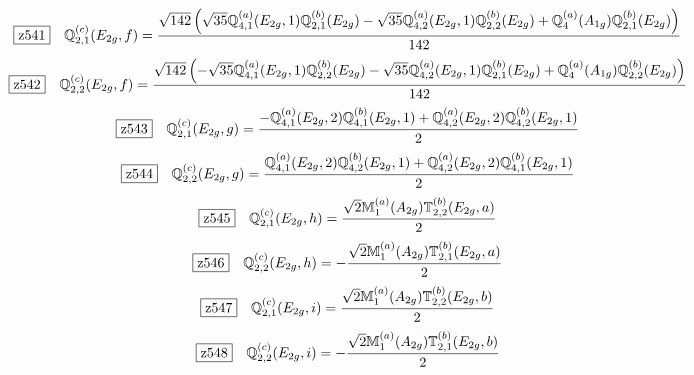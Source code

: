 \documentclass[fleqn,10pt,landscape]{jsarticle}
\begin{document}
\begin{dmath*}
\hspace*{3mm}\fbox{z541}\quad \mathbb{Q}_{2,1}^{(c)}(E_{2g},f)=\frac{\sqrt{142} \left(\sqrt{35} \mathbb{Q}_{4,1}^{(a)}(E_{2g},1) \mathbb{Q}_{2,1}^{(b)}(E_{2g}) - \sqrt{35} \mathbb{Q}_{4,2}^{(a)}(E_{2g},1) \mathbb{Q}_{2,2}^{(b)}(E_{2g}) + \mathbb{Q}_{4}^{(a)}(A_{1g}) \mathbb{Q}_{2,1}^{(b)}(E_{2g})\right)}{142}
\end{dmath*}
\begin{dmath*}
\hspace*{3mm}\fbox{z542}\quad \mathbb{Q}_{2,2}^{(c)}(E_{2g},f)=\frac{\sqrt{142} \left(- \sqrt{35} \mathbb{Q}_{4,1}^{(a)}(E_{2g},1) \mathbb{Q}_{2,2}^{(b)}(E_{2g}) - \sqrt{35} \mathbb{Q}_{4,2}^{(a)}(E_{2g},1) \mathbb{Q}_{2,1}^{(b)}(E_{2g}) + \mathbb{Q}_{4}^{(a)}(A_{1g}) \mathbb{Q}_{2,2}^{(b)}(E_{2g})\right)}{142}
\end{dmath*}
\begin{dmath*}
\hspace*{3mm}\fbox{z543}\quad \mathbb{Q}_{2,1}^{(c)}(E_{2g},g)=\frac{- \mathbb{Q}_{4,1}^{(a)}(E_{2g},2) \mathbb{Q}_{4,1}^{(b)}(E_{2g},1) + \mathbb{Q}_{4,2}^{(a)}(E_{2g},2) \mathbb{Q}_{4,2}^{(b)}(E_{2g},1)}{2}
\end{dmath*}
\begin{dmath*}
\hspace*{3mm}\fbox{z544}\quad \mathbb{Q}_{2,2}^{(c)}(E_{2g},g)=\frac{\mathbb{Q}_{4,1}^{(a)}(E_{2g},2) \mathbb{Q}_{4,2}^{(b)}(E_{2g},1) + \mathbb{Q}_{4,2}^{(a)}(E_{2g},2) \mathbb{Q}_{4,1}^{(b)}(E_{2g},1)}{2}
\end{dmath*}
\begin{dmath*}
\hspace*{3mm}\fbox{z545}\quad \mathbb{Q}_{2,1}^{(c)}(E_{2g},h)=\frac{\sqrt{2} \mathbb{M}_{1}^{(a)}(A_{2g}) \mathbb{T}_{2,2}^{(b)}(E_{2g},a)}{2}
\end{dmath*}
\begin{dmath*}
\hspace*{3mm}\fbox{z546}\quad \mathbb{Q}_{2,2}^{(c)}(E_{2g},h)=- \frac{\sqrt{2} \mathbb{M}_{1}^{(a)}(A_{2g}) \mathbb{T}_{2,1}^{(b)}(E_{2g},a)}{2}
\end{dmath*}
\begin{dmath*}
\hspace*{3mm}\fbox{z547}\quad \mathbb{Q}_{2,1}^{(c)}(E_{2g},i)=\frac{\sqrt{2} \mathbb{M}_{1}^{(a)}(A_{2g}) \mathbb{T}_{2,2}^{(b)}(E_{2g},b)}{2}
\end{dmath*}
\begin{dmath*}
\hspace*{3mm}\fbox{z548}\quad \mathbb{Q}_{2,2}^{(c)}(E_{2g},i)=- \frac{\sqrt{2} \mathbb{M}_{1}^{(a)}(A_{2g}) \mathbb{T}_{2,1}^{(b)}(E_{2g},b)}{2}
\end{dmath*}
\end{document}
